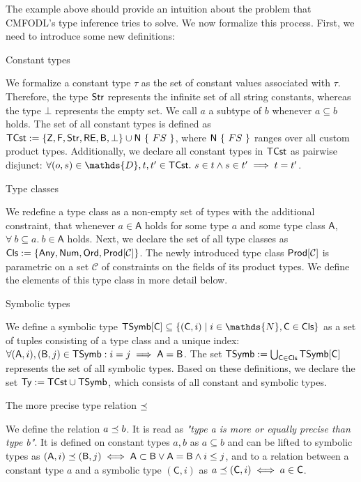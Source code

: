The example above should provide an intuition about the problem that CMFODL's type inference tries to solve. We now formalize this process. First, we need to introduce some new definitions:

\begin{definition}
	Constant types
\end{definition}
We formalize a constant type $\tau$ as the set of constant values associated with $\tau$. Therefore, the type $\mathsf{Str}$ represents the infinite set of all string constants, whereas the type $\bot$ represents the empty set. We call $a$ a subtype of $b$ whenever $a \subseteq b$ holds. The set of all constant types is defined as $\mfodlTCst := \{ \mfodlInt, \mfodlFloat, \mfodlString, \mfodlRegex, \mfodlBool, \bot \} \cup \mfodlNames\ \{\ FS\ \}$, where $\mfodlNames\ \{\ FS\ \}$ ranges over all custom product types. Additionally, we declare all constant types in $\mathsf{TCst}$ as pairwise disjunct: $\forall (o, s) \in \mathds{D}, t, t' \in \mfodlTCst .\ s \in t \land s \in t' \implies t = t'$.

\begin{definition}
	Type classes
\end{definition}
We redefine a type class as a non-empty set of types with the additional constraint, that whenever $a \in \mathsf{A}$ holds for some type $a$ and some type class $\mathsf{A}$, $\forall\ b \subseteq a.\ b \in \mathsf{A}$ holds. Next, we declare the set of all type classes as $\mathsf{Cls} := \{ \mathsf{Any}, \mathsf{Num}, \mathsf{Ord}, \mathsf{Prod[\mathcal{C}]} \}$. The newly introduced type class $\mathsf{Prod[\mathcal{C}]}$ is parametric on a set $\mathcal{C}$ of constraints on the fields of its product types. We define the elements of this type class in more detail below.

\begin{definition}
	Symbolic types
\end{definition}
We define a symbolic type $\mathsf{TSymb[C]} \subseteq \{(\mathsf{C}, i) \mid i \in \mathds{N}, \mathsf{C} \in \mfodlTyCls \}$ as a set of tuples consisting of a type class and a unique index: $\forall (\mathsf{A}, i), (\mathsf{B}, j) \in \mathsf{TSymb} : i = j \implies \mathsf{A} = \mathsf{B}$. The set $\mathsf{TSymb} := \bigcup_{\mathsf{C} \in \mathsf{Cls}{}} \mathsf{TSymb[C]}$ represents the set of all symbolic types. Based on these definitions, we declare the set $\mathsf{Ty} := \mathsf{TCst} \cup \mathsf{TSymb}$, which consists of all constant and symbolic types.

\begin{definition}
	The more precise type relation $\preceq$
\end{definition}
We define the relation $a \preceq b$. It is read as \textit{"type a is more or equally precise than type b"}. It is defined on constant types $a, b$ as $a \subseteq b$ and can be lifted to symbolic types as $(\mathsf{A}, i) \preceq (\mathsf{B}, j) \iff \mathsf{A} \subset \mathsf{B} \lor \mathsf{A} = \mathsf{B} \land i \leq j$, and to a relation between a constant type $a$ and a symbolic type $(\mathsf{C}, i)$ as $a \preceq (\mathsf{C}, i) \iff a \in \mathsf{C}$.

